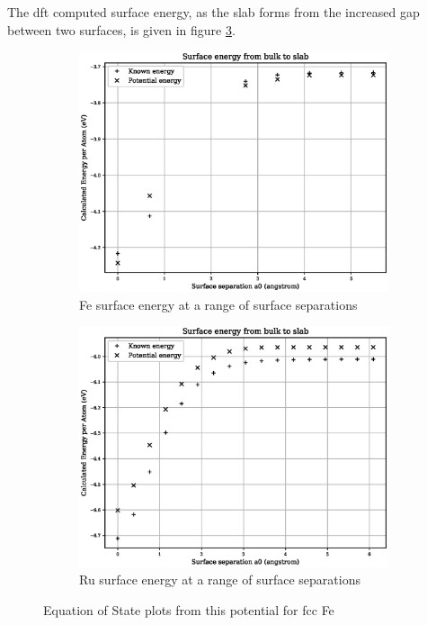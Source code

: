 The \acrshort{dft} computed surface energy, as the slab forms from the increased gap between two surfaces, is given in figure \ref{fig:feru-energy-fitting}.

\begin{figure}[htb]
\begin{subfigure}{.42\textwidth}
  \centering
  \includegraphics[width=.94\linewidth]{chapters/potentials_fe_pd_ru/feru_potential/fe_surface_energy.eps}  
  \caption{Fe surface energy at a range of surface separations}
  \label{fig:fepd-fefcc-rose}
\end{subfigure}
\begin{subfigure}{.42\textwidth}
  \centering
  \includegraphics[width=.94\linewidth]{chapters/potentials_fe_pd_ru/feru_potential/ru_surface_energy.eps}  
  \caption{Ru surface energy at a range of surface separations}
  \label{fig:feru-fefcc-bmeos}
\end{subfigure}
\label{fig:feru-energy-fitting}
\caption{Equation of State plots from this potential for \acrshort{fcc} Fe}
\end{figure}











